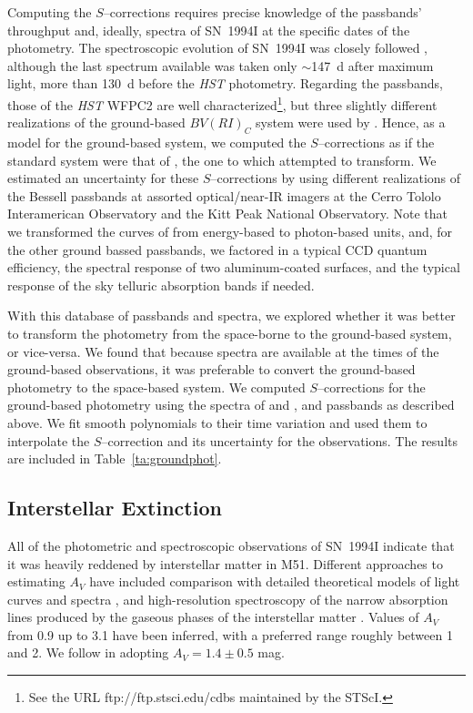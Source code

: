 \documentclass[12pt,manuscript]{aastex}
\begin{document}
Computing the $S$--corrections requires precise knowledge of 
the passbands' throughput and, ideally, spectra of SN~1994I at 
the specific dates of the photometry.
%
The spectroscopic evolution of SN~1994I was closely 
followed \citep{fetal95,cetal96b}, although the last spectrum 
available was taken only $\sim$147~d after maximum light,
more than 130~d before the {\em HST} photometry.
%
Regarding the passbands, those of the {\em HST} WFPC2 are well
characterized\footnote{See the URL ftp://ftp.stsci.edu/cdbs 
maintained by the STScI.}, but three slightly different 
realizations of the ground-based $BV(RI)_C$ system
were used by \citet{retal96}.
%
Hence, as a model for the ground-based system, we computed 
the $S$--corrections as if the standard system were that of 
\citet{bessell90}, the one to which \citet{retal96} attempted 
to transform.
%
We estimated an uncertainty for these $S$--corrections
by using different realizations of the Bessell passbands
at assorted optical/near-IR imagers at the Cerro Tololo 
Interamerican Observatory and the Kitt Peak National Observatory.
%
Note that we transformed the curves of \citet{bessell90} 
from energy-based to photon-based units, and, for the
other ground bassed passbands, we factored in a typical
CCD quantum efficiency, the spectral response of two 
aluminum-coated surfaces, and the typical response of the sky 
telluric absorption bands if needed.


With this database of passbands and spectra, we explored whether 
it was better to transform the photometry from the space-borne 
to the ground-based system, or vice-versa. 
%
We found that because spectra are available at the times of the 
ground-based observations, it was preferable to convert the 
ground-based photometry to the space-based system.
%
We computed $S$--corrections for the ground-based photometry
using the spectra of \citet{fetal95} and \citet{cetal96b},
and passbands as described above. We fit smooth polynomials 
to their time variation and used them to interpolate the 
$S$--correction and its uncertainty for the \citet{retal96} 
observations.
%
The results are included in Table~\ref{ta:groundphot}.


\subsection{Interstellar Extinction}

\label{sse:extinction}

All of the photometric and spectroscopic observations of 
SN~1994I indicate that it was heavily reddened by interstellar 
matter in M51.
%
Different approaches to estimating $A_V$ have included comparison 
with detailed theoretical models of light curves \citep{ietal94}
and spectra \citep{betal96,betal99,metal99}, and high-resolution 
spectroscopy of the narrow absorption lines produced by the gaseous 
phases of the interstellar matter \citep{hetal95}.
%
Values of $A_V$ from 0.9 up to 3.1 have been inferred, with a 
preferred range roughly between 1 and 2.
%
We follow \citet{retal96} in adopting $A_V = 1.4 \pm 0.5$ mag.
\end{document}
